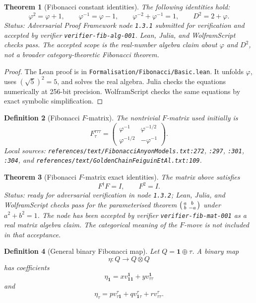 \documentclass[11pt]{article}
\newtheorem{definition}{Definition}[section]
\newtheorem{theorem}[definition]{Theorem}
\begin{document}
\begin{theorem}[Fibonacci constant identities]
The following identities hold:
\[
\varphi^2=\varphi+1,\qquad
\varphi^{-1}=\varphi-1,\qquad
\varphi^{-2}+\varphi^{-1}=1,\qquad
D^2=2+\varphi.
\]
Status: Adversarial Proof Framework node \texttt{1.3.1} submitted for
verification and accepted by verifier \texttt{verifier-fib-alg-001}. Lean,
Julia, and WolframScript checks pass. The accepted scope is the real-number
algebra claim about \(\varphi\) and \(D^2\), not a broader category-theoretic
Fibonacci theorem.
\end{theorem}

\begin{proof}
The Lean proof is in \texttt{Formalisation/Fibonacci/Basic.lean}. It unfolds
\(\varphi\), uses \((\sqrt 5)^2=5\), and solves the real algebra. Julia checks
the equations numerically at 256-bit precision. WolframScript checks the same
equations by exact symbolic simplification.
\end{proof}

\begin{definition}[Fibonacci \(F\)-matrix]
The nontrivial \(F\)-matrix used initially is
\[
F^{\tau\tau\tau}_\tau=
\begin{pmatrix}
\varphi^{-1} & \varphi^{-1/2}\\
\varphi^{-1/2} & -\varphi^{-1}
\end{pmatrix}.
\]
Local sources: \texttt{references/text/FibonacciAnyonModels.txt:272},
\texttt{:297}, \texttt{:301}, \texttt{:304}, and
\texttt{references/text/GoldenChainFeiguinEtAl.txt:109}.
\end{definition}

\begin{theorem}[Fibonacci \(F\)-matrix exact identities]
The matrix above satisfies
\[
F^\dagger F=I,\qquad F^2=I.
\]
Status: ready for adversarial verification in node \texttt{1.3.2}; Lean,
Julia, and WolframScript checks pass for the parameterised theorem
\(\begin{psmallmatrix}a&b\\ b&-a\end{psmallmatrix}\) under \(a^2+b^2=1\).
The node has been accepted by verifier \texttt{verifier-fib-mat-001} as a
real matrix algebra claim. The categorical meaning of the \(F\)-move is not
included in that acceptance.
\end{theorem}

\begin{definition}[General binary Fibonacci map]
Let \(Q=\mathbf 1\oplus\tau\). A binary map
\[
\eta:Q\to Q\otimes Q
\]
has coefficients
\[
\eta_{\mathbf 1}=xv^{\mathbf 1}_{\mathbf 1\mathbf 1}
+yv^{\mathbf 1}_{\tau\tau}
\]
and
\[
\eta_\tau=pv^\tau_{\tau\mathbf 1}
+qv^\tau_{\mathbf 1\tau}
+rv^\tau_{\tau\tau}.
\]
\end{definition}
\end{document}
